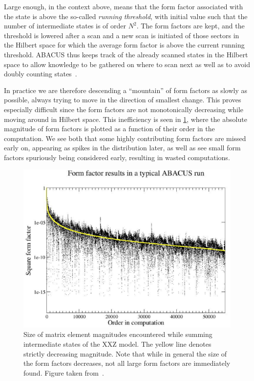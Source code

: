 \documentclass[11pt, a4paper]{report} %
\begin{document}
Large enough, in the context above, means that the form factor associated with the state is above the so-called \textit{running threshold}, with initial value such that the number of intermediate states is of order \(N^2\).
The form factors are kept, and the threshold is lowered after a scan and a new scan is initiated of those sectors in the Hilbert space for which the average form factor is above the current running threshold.
ABACUS thus keeps track of the already scanned states in the Hilbert space to allow knowledge to be gathered on where to scan next as well as to avoid doubly counting states~\cite{Caux2009}.

In practice we are therefore descending a ``mountain'' of form factors as slowly as possible, always trying to move in the direction of smallest change.
This proves especially difficult since the form factors are not monotonically decreasing while moving around in Hilbert space.
This inefficiency is seen in \cref{fig:orderedmagnitudes}, where the absolute magnitude of form factors is plotted as a function of their order in the computation.
We see both that some highly contributing form factors are missed early on, appearing as spikes in the distribution later, as well as see small form factors spuriously being considered early, resulting in wasted computations.
\begin{figure}[tb!]
  \centering
  \includegraphics[width=\textwidth]{FFsq_vs_order_D0p6N50M20_small}
  \caption{Size of matrix element magnitudes encountered while summing intermediate states of the XXZ model. The yellow line denotes strictly decreasing magnitude. Note that while in general the size of the form factors decreases, not all large form factors are immediately found. Figure taken from~\cite{Caux2009}.}
\label{fig:orderedmagnitudes}
\end{figure}
\end{document}
